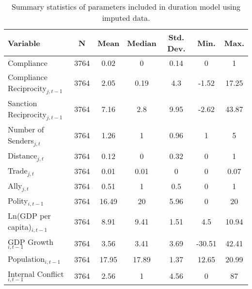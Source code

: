 \begin{table}[ht]
\centering
{\normalsize
\begin{tabular}{lcccccc}
 Variable & N & Mean & Median & Std. Dev. & Min. & Max. \\ 
  \hline
\hline
Compliance & 3764 & 0.02 & 0 & 0.14 & 0 & 1 \\ 
  Compliance Reciprocity$_{j,t-1}$ & 3764 & 2.05 & 0.19 & 4.3 & -1.52 & 17.25 \\ 
  Sanction Reciprocity$_{j,t-1}$ & 3764 & 7.16 & 2.8 & 9.95 & -2.62 & 43.87 \\ 
  Number of Senders$_{j,t}$ & 3764 & 1.26 & 1 & 0.96 & 1 & 5 \\ 
  Distance$_{j,t}$ & 3764 & 0.12 & 0 & 0.32 & 0 & 1 \\ 
  Trade$_{j,t}$ & 3764 & 0.01 & 0.01 & 0 & 0 & 0.07 \\ 
  Ally$_{j,t}$ & 3764 & 0.51 & 1 & 0.5 & 0 & 1 \\ 
  Polity$_{i,t-1}$ & 3764 & 16.49 & 20 & 5.96 & 0 & 20 \\ 
  Ln(GDP per capita)$_{i,t-1}$ & 3764 & 8.91 & 9.41 & 1.51 & 4.5 & 10.94 \\ 
  GDP Growth$_{i,t-1}$ & 3764 & 3.56 & 3.41 & 3.69 & -30.51 & 42.41 \\ 
  Population$_{i,t-1}$ & 3764 & 17.95 & 17.89 & 1.37 & 12.65 & 20.99 \\ 
  Internal Conflict$_{i,t-1}$ & 3764 & 2.56 & 1 & 4.56 & 0 & 87 \\ 
   \hline
\hline
\end{tabular}
}
\caption{Summary statistics of parameters included in duration model using imputed data.} 
\label{tab:summImp}
\end{table}
